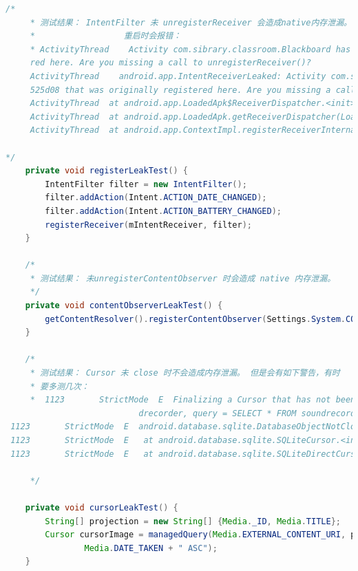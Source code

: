 \documentclass[a4paper, 11pt]{article}
\begin{document}
\begin{lstlisting}[language=java,]
    /*
     * 测试结果： IntentFilter 未 unregisterReceiver 会造成native内存泄漏。 但当进程
     *                  重启时会报错：
     * ActivityThread    Activity com.sibrary.classroom.Blackboard has leaked IntentReceiver com.sibrary.classroom.Blackboard$1@40525d08 that was originally registe
     red here. Are you missing a call to unregisterReceiver()?
     ActivityThread    android.app.IntentReceiverLeaked: Activity com.sibrary.classroom.Blackboard has leaked IntentReceiver com.sibrary.classroom.Blackboard$1@40
     525d08 that was originally registered here. Are you missing a call to unregisterReceiver()?
     ActivityThread  at android.app.LoadedApk$ReceiverDispatcher.<init>(LoadedApk.java:756)
     ActivityThread  at android.app.LoadedApk.getReceiverDispatcher(LoadedApk.java:551)
     ActivityThread  at android.app.ContextImpl.registerReceiverInternal(ContextImpl.java:803)

*/
    private void registerLeakTest() {
        IntentFilter filter = new IntentFilter();
        filter.addAction(Intent.ACTION_DATE_CHANGED);
        filter.addAction(Intent.ACTION_BATTERY_CHANGED);
        registerReceiver(mIntentReceiver, filter);
    }

    /*
     * 测试结果： 未unregisterContentObserver 时会造成 native 内存泄漏。
     */
    private void contentObserverLeakTest() {
        getContentResolver().registerContentObserver(Settings.System.CONTENT_URI, true, mDateFomat);
    }

    /*
     * 测试结果： Cursor 未 close 时不会造成内存泄漏。 但是会有如下警告，有时
     * 要多测几次：
     *  1123       StrictMode  E  Finalizing a Cursor that has not been deactivated or closed. database = /data/data/com.android.soundrecorder/databases/simple, table = soun
                           drecorder, query = SELECT * FROM soundrecorder ORDER BY _id
 1123       StrictMode  E  android.database.sqlite.DatabaseObjectNotClosedException: Application did not close the cursor or database object that was opened here
 1123       StrictMode  E  	at android.database.sqlite.SQLiteCursor.<init>(SQLiteCursor.java:214)
 1123       StrictMode  E  	at android.database.sqlite.SQLiteDirectCursorDriver.query(SQLiteDirectCursorDriver.java:53)

     */

    private void cursorLeakTest() {
        String[] projection = new String[] {Media._ID, Media.TITLE};
        Cursor cursorImage = managedQuery(Media.EXTERNAL_CONTENT_URI, projection, null, null, 
                Media.DATE_TAKEN + " ASC");
    }


\end{lstlisting}
\end{document}
